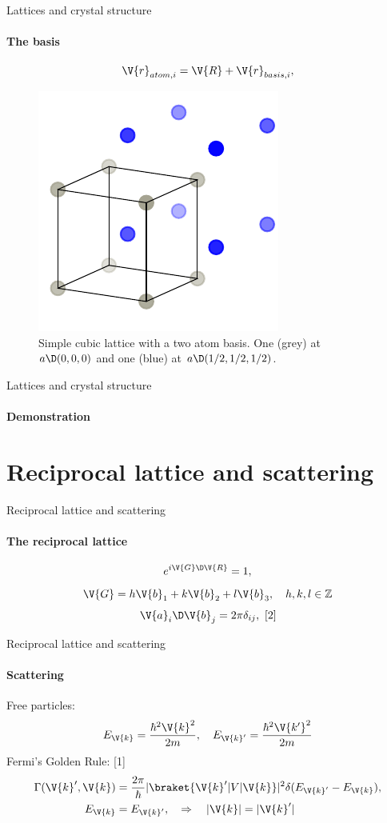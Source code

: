 \documentclass{beamer}
\begin{document}
\begin{frame}{Lattices and crystal structure}
\framesubtitle{The basis}
\begin{equation*}
	\V{r}_{atom,i} = \V{R} + \V{r}_{basis, i},
\end{equation*}
\pause
\begin{figure}[H]
	\centering
	\includegraphics[width=.35\linewidth]{figures/lattice_unfinished_1.pdf}
	\caption{Simple cubic lattice with a two atom basis. One (grey) at $ a \D (0,0,0) $ and one (blue) at $ a\D(1/2, 1/2, 1/2) $.}
\end{figure}
\end{frame}


\begin{frame}{Lattices and crystal structure}
\framesubtitle{Demonstration}
\end{frame}


\section{Reciprocal lattice and scattering}
\begin{frame}{Reciprocal lattice and scattering}
\framesubtitle{The reciprocal lattice}
\begin{equation*}
	e^{i \V{G} \D\V{R}} = 1,
\end{equation*}
\begin{equation*}
	\V{G} = h \V{b}_1 + k\V{b}_2 + l\V{b}_3, \quad h,k,l \in \mathbb{Z}
\end{equation*}
\begin{equation*}
	\V{a}_i \D \V{b}_j = 2\pi \delta_{ij}, \ [2]
\end{equation*}
\end{frame}

\begin{frame}{Reciprocal lattice and scattering}
\framesubtitle{Scattering}

Free particles:
\begin{equation*}
	E_{\V{k}} = \frac{\hbar^2 \V{k}^2}{2m}, \quad E_{\V{k}'} = \frac{\hbar^2 \V{k'}^2}{2m}
\end{equation*}
Fermi's Golden Rule: [1]
\begin{align*}
	\Gamma(\V{k}', \V{k}) &= \frac{2\pi}{\hbar}|\braket{\V{k}' | V | \V{k}}|^2 \delta(E_{\V{k}'}-E_{\V{k}}), \\
	E_{\V{k}} &= E_{\V{k}'}, \quad \Rightarrow \quad |\V{k}|=|\V{k}'|
\end{align*}
\end{frame}
\end{document}
